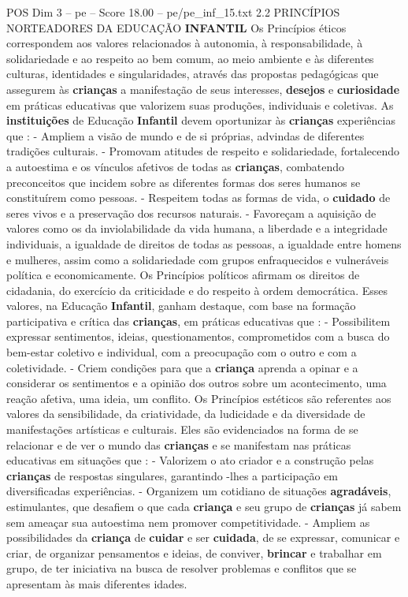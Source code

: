 \begin{textsample}{POS Dim 3 – pe – Score 18.00 – pe/pe\_inf\_15.txt}  \label{ex:f3_pos_274}
2.2 PRINCÍPIOS NORTEADORES DA EDUCAÇÃO \textbf{INFANTIL} Os Princípios éticos correspondem aos valores relacionados à autonomia, à responsabilidade, à solidariedade e ao respeito ao bem comum, ao meio ambiente e às diferentes culturas, identidades e singularidades, através das propostas pedagógicas que assegurem às \textbf{crianças} a manifestação de seus interesses, \textbf{desejos} e \textbf{curiosidade} em práticas educativas que valorizem suas produções, individuais e coletivas.
As \textbf{instituições} de Educação \textbf{Infantil} devem oportunizar às \textbf{crianças} experiências que : - Ampliem a visão de mundo e de si próprias, advindas de diferentes tradições culturais. - Promovam atitudes de respeito e solidariedade, fortalecendo a autoestima e os vínculos afetivos de todas as \textbf{crianças}, combatendo preconceitos que incidem sobre as diferentes formas dos seres humanos se constituírem como pessoas. - Respeitem todas as formas de vida, o \textbf{cuidado} de seres vivos e a preservação dos recursos naturais. - Favoreçam a aquisição de valores como os da inviolabilidade da vida humana, a liberdade e a integridade individuais, a igualdade de direitos de todas as pessoas, a igualdade entre homens e mulheres, assim como a solidariedade com grupos enfraquecidos e vulneráveis política e economicamente.
Os Princípios políticos afirmam os direitos de cidadania, do exercício da criticidade e do respeito à ordem democrática.
Esses valores, na Educação \textbf{Infantil}, ganham destaque, com base na formação participativa e crítica das \textbf{crianças}, em práticas educativas que : - Possibilitem expressar sentimentos, ideias, questionamentos, comprometidos com a busca do bem-estar coletivo e individual, com a preocupação com o outro e com a coletividade. - Criem condições para que a \textbf{criança} aprenda a opinar e a considerar os sentimentos e a opinião dos outros sobre um acontecimento, uma reação afetiva, uma ideia, um conflito.
Os Princípios estéticos são referentes aos valores da sensibilidade, da criatividade, da ludicidade e da diversidade de manifestações artísticas e culturais.
Eles são evidenciados na forma de se relacionar e de ver o mundo das \textbf{crianças} e se manifestam nas práticas educativas em situações que : - Valorizem o ato criador e a construção pelas \textbf{crianças} de respostas singulares, garantindo -lhes a participação em diversificadas experiências. - Organizem um cotidiano de situações \textbf{agradáveis}, estimulantes, que desafiem o que cada \textbf{criança} e seu grupo de \textbf{crianças} já sabem sem ameaçar sua autoestima nem promover competitividade. - Ampliem as possibilidades da \textbf{criança} de \textbf{cuidar} e ser \textbf{cuidada}, de se expressar, comunicar e criar, de organizar pensamentos e ideias, de conviver, \textbf{brincar} e trabalhar em grupo, de ter iniciativa na busca de resolver problemas e conflitos que se apresentam às mais diferentes idades.

\end{textsample}

